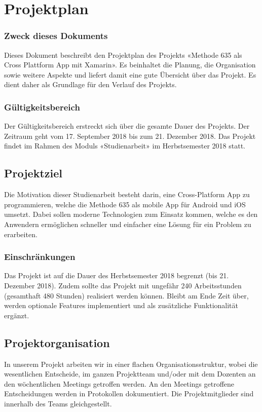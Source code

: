 \section{Projektplan}

\subsubsection{Zweck dieses Dokuments}
Dieses Dokument beschreibt den Projektplan des Projekts «Methode 635 als Cross Plattform App mit Xamarin». Es beinhaltet die Planung, die Organisation sowie weitere Aspekte und liefert damit eine gute Übersicht über das Projekt. Es dient daher als Grundlage für den Verlauf des Projekts.

\subsubsection{Gültigkeitsbereich}
Der Gültigkeitsbereich erstreckt sich über die gesamte Dauer des Projekts. Der Zeitraum geht vom 17. September 2018 bis zum 21. Dezember 2018. Das Projekt findet im Rahmen des Moduls «Studienarbeit» im Herbstsemester 2018 statt.

\subsection{Projektziel}
Die Motivation dieser Studienarbeit besteht darin, eine Cross-Platform App zu programmieren, welche die Methode 635 als mobile App für Android und iOS umsetzt. Dabei sollen moderne Technologien zum Einsatz kommen, welche es den Anwendern ermöglichen schneller und einfacher eine Lösung für ein Problem zu erarbeiten.

\subsubsection{Einschränkungen}
Das Projekt ist auf die Dauer des Herbstsemester 2018 begrenzt (bis 21. Dezember 2018). Zudem sollte das Projekt mit ungefähr 240 Arbeitsstunden (gesamthaft 480 Stunden) realisiert werden können. Bleibt am Ende Zeit über, werden optionale Features implementiert und als zusätzliche Funktionalität ergänzt.

\subsection{Projektorganisation}
In unserem Projekt arbeiten wir in einer flachen Organisationsstruktur, wobei die wesentlichen Entscheide, im ganzen Projektteam und/oder mit dem Dozenten an den wöchentlichen Meetings getroffen werden. An den Meetings getroffene Entscheidungen werden in Protokollen dokumentiert. Die Projektmitglieder sind innerhalb des Teams gleichgestellt.

